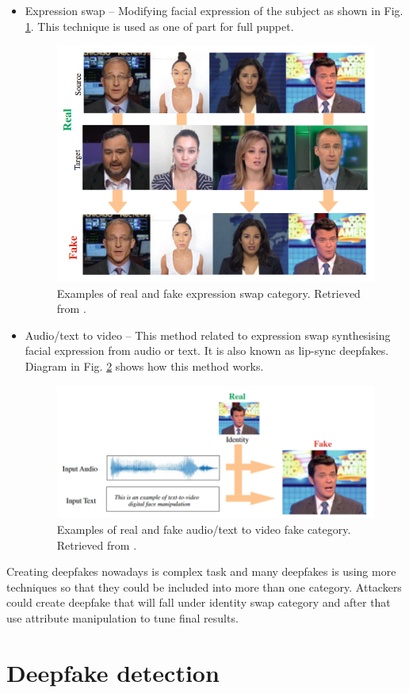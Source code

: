 \begin{itemize}
\item Expression swap – Modifying facial expression of the subject as shown in Fig. \ref{fig:expression_swap}. This technique is used as one of part for full puppet.
\begin{figure}[H]
    \centering
    \includegraphics[width=.52\linewidth]{other-fig/expression_swap.png}        
    \caption{Examples of real and fake expression swap category. Retrieved from \cite{IntroductionToDigitalFaceManipulation}.}
\label{fig:expression_swap}
\end{figure}

\item Audio/text to video – This method related to expression swap synthesising facial expression from audio or text. It is also known as lip-sync deepfakes. Diagram in Fig. \ref{fig:audio_to_video} shows how this method works.
\begin{figure}[H]
    \centering
    \includegraphics[width=.6\linewidth]{other-fig/audio_to_video.png}        
    \caption{Examples of real and fake audio/text to video fake category. Retrieved from \cite{IntroductionToDigitalFaceManipulation}.}
\label{fig:audio_to_video}
\end{figure}
\end{itemize}

Creating deepfakes nowadays is complex task and many deepfakes is using more techniques so that they could be included into more than one category. Attackers could create deepfake that will fall under identity swap category and after that use attribute manipulation to tune final results.

\chapter{Deepfake detection}
\label{chapter:deepfake_detectoin}

